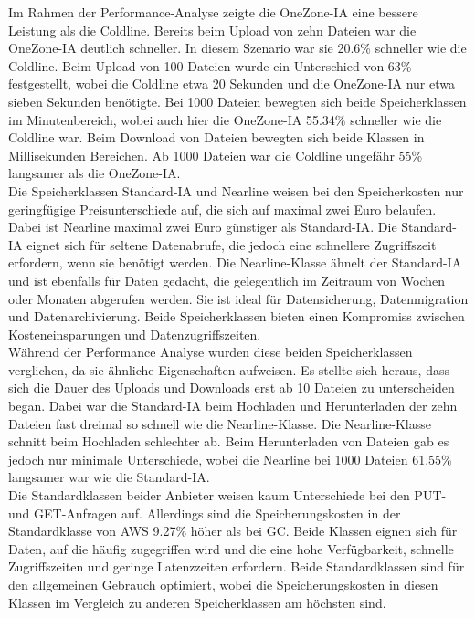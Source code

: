 Im Rahmen der Performance-Analyse zeigte die OneZone-IA eine bessere Leistung als die Coldline. Bereits beim Upload von zehn Dateien war die OneZone-IA deutlich schneller. In diesem Szenario war sie 20.6\% schneller wie die Coldline. Beim Upload von 100 Dateien wurde ein Unterschied von 63\% festgestellt, wobei die Coldline etwa 20 Sekunden und die OneZone-IA nur etwa sieben Sekunden benötigte. Bei 1000 Dateien bewegten sich beide Speicherklassen im Minutenbereich, wobei auch hier die OneZone-IA 55.34\% schneller wie die Coldline war. Beim Download von Dateien bewegten sich beide Klassen in Millisekunden Bereichen. Ab 1000 Dateien war die Coldline ungefähr 55\% langsamer als die OneZone-IA.\\

Die Speicherklassen Standard-IA und Nearline weisen bei den Speicherkosten nur geringfügige Preisunterschiede  auf, die sich auf maximal zwei Euro belaufen. Dabei ist Nearline maximal zwei Euro günstiger als Standard-IA. Die Standard-IA eignet sich für seltene Datenabrufe, die jedoch eine schnellere Zugriffszeit erfordern, wenn sie benötigt werden. Die Nearline-Klasse ähnelt der Standard-IA und ist ebenfalls für Daten gedacht, die gelegentlich im Zeitraum von Wochen oder Monaten abgerufen werden. Sie ist ideal für Datensicherung, Datenmigration und Datenarchivierung. Beide Speicherklassen bieten einen Kompromiss zwischen Kosteneinsparungen und Datenzugriffszeiten.\\

Während der Performance Analyse wurden diese beiden Speicherklassen verglichen, da sie ähnliche Eigenschaften aufweisen. Es stellte sich heraus, dass sich die Dauer des Uploads und Downloads erst ab 10 Dateien zu unterscheiden began. Dabei war die Standard-IA beim Hochladen und Herunterladen der zehn Dateien fast dreimal so schnell wie die Nearline-Klasse. Die Nearline-Klasse schnitt beim Hochladen schlechter ab. Beim Herunterladen von Dateien gab es jedoch nur minimale Unterschiede, wobei die Nearline bei 1000 Dateien 61.55\% langsamer war wie die Standard-IA.\\

Die Standardklassen beider Anbieter weisen kaum Unterschiede bei den PUT- und GET-Anfragen auf. Allerdings sind die Speicherungskosten in der Standardklasse von AWS 9.27\% höher als bei GC. Beide Klassen eignen sich für Daten, auf die häufig zugegriffen wird und die eine hohe Verfügbarkeit, schnelle Zugriffszeiten und geringe Latenzzeiten erfordern. Beide Standardklassen sind für den allgemeinen Gebrauch optimiert, wobei die Speicherungskosten in diesen Klassen im Vergleich zu anderen Speicherklassen am höchsten sind.\\

